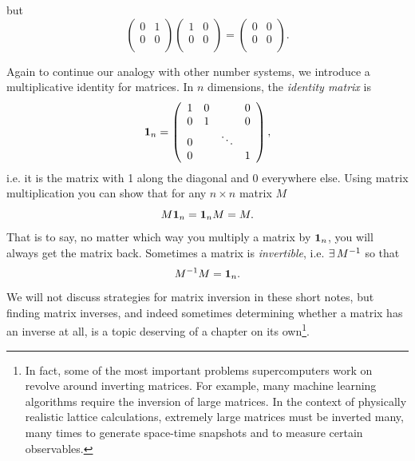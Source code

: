 but
\begin{equation}
  \left(\begin{array}{cc}
          0   & 1\\ 
          0   & 0\\ 
            \end{array}\right)
  \left(\begin{array}{cc}
          1   & 0\\ 
          0   & 0\\ 
            \end{array}\right)
  =\left(\begin{array}{cc}
          0   & 0\\ 
          0   & 0\\ 
            \end{array}\right).
\end{equation}

Again to continue our analogy with other number systems,
we introduce a multiplicative identity for matrices.
In $n$ dimensions, the {\it identity matrix} is
\begin{equation}
  {\mathbf 1}_n=\left(\begin{array}{cccc}
          1   & 0 &       & 0\\
          0   & 1 &       & 0\\
          0   &   & \ddots& \\
          0   &   &       & 1
            \end{array}\right), 
\end{equation}
i.e. it is the matrix with 1 along the diagonal and 0 everywhere else. Using
matrix multiplication you can show that for any $n\times n$ matrix $M$
\begin{equation}
  M{\mathbf 1}_n ={\mathbf 1}_n M = M.
\end{equation}
That is to say, no matter which way you multiply a matrix by ${\mathbf 1}_n$, 
you will always get the matrix back. 
Sometimes a matrix is {\it invertible}, i.e. $\operatorname{\exists} M^{-1}$ so that
\begin{equation}
  M^{-1} M={\mathbf 1}_n. 
\end{equation}
We will not discuss strategies for matrix inversion in these short notes, but
finding matrix inverses, and indeed sometimes determining whether a matrix has
an inverse at all, is a topic deserving of a chapter on its 
own\footnote{In fact, some of the most important problems supercomputers work
on revolve around inverting matrices. For example, many machine learning
algorithms require the inversion of large matrices. In the context
of physically realistic lattice calculations, extremely large matrices must be
inverted many, many times to generate space-time snapshots and to measure
certain observables.}. 

